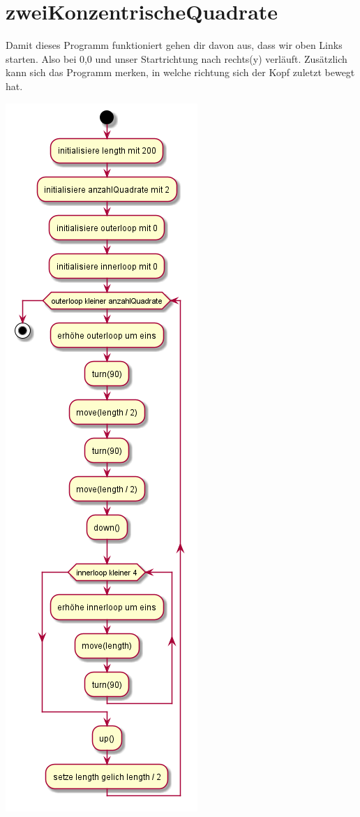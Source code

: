 \section{zweiKonzentrischeQuadrate}
Damit dieses Programm funktioniert gehen dir davon aus, dass wir oben Links starten. Also bei 0,0 und unser Startrichtung nach rechts(y) verläuft. Zusätzlich kann sich das Programm merken, in welche richtung sich der Kopf zuletzt bewegt hat.

\includegraphics[scale=0.55]{uml/zweiKonzentrischeQuadrate.png}